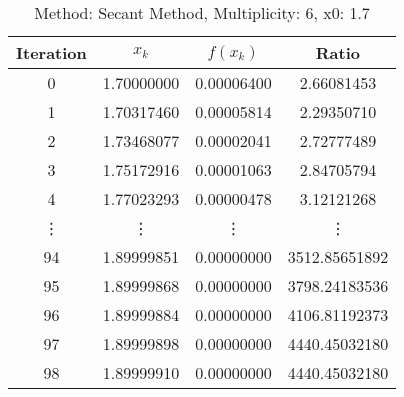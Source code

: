 \begin{table}
\centering
\caption{Method: Secant Method, Multiplicity: 6, x0: 1.7}
\label{tab:table_Secant_Method_6_1_7}
\begin{tabular}{c c c c}
\toprule
Iteration &      $x_k$ &   $f(x_k)$ &         Ratio \\
\midrule
        0 & 1.70000000 & 0.00006400 &    2.66081453 \\
        1 & 1.70317460 & 0.00005814 &    2.29350710 \\
        2 & 1.73468077 & 0.00002041 &    2.72777489 \\
        3 & 1.75172916 & 0.00001063 &    2.84705794 \\
        4 & 1.77023293 & 0.00000478 &    3.12121268 \\
   \vdots &     \vdots &     \vdots &        \vdots \\
       94 & 1.89999851 & 0.00000000 & 3512.85651892 \\
       95 & 1.89999868 & 0.00000000 & 3798.24183536 \\
       96 & 1.89999884 & 0.00000000 & 4106.81192373 \\
       97 & 1.89999898 & 0.00000000 & 4440.45032180 \\
       98 & 1.89999910 & 0.00000000 & 4440.45032180 \\
\bottomrule
\end{tabular}
\end{table}
